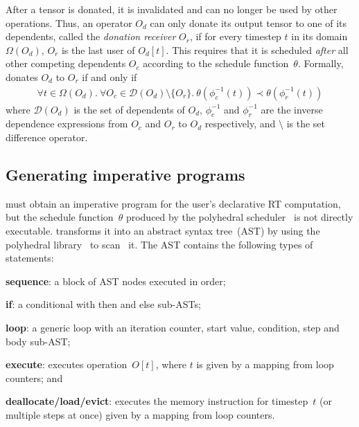 After a tensor is donated, it is invalidated and can no longer be used by other operations.
Thus, an operator $O_d$ can only donate its output tensor to one of its dependents, called the \emph{donation receiver} $O_r$, if for every timestep $t$ in its domain $\Omega(O_d)$, $O_r$ is the last user of $O_d[t]$. This requires that it is scheduled \emph{after} all other competing dependents $O_c$ according to the schedule function~$\theta$. Formally, \sys donates $O_d$ to $O_r$ if and only if
\begin{align*}
\forall t \in \Omega(O_d) .\ \forall O_c \in \mathcal{D}(O_d) \setminus \{O_r\} .\ \theta\left(\phi^{-1}_{c}(t)\right) \prec \theta\left(\phi^{-1}_{r}(t)\right)
\end{align*}
where $\mathcal{D}(O_d)$ is the set of dependents of $O_d$, $\phi^{-1}_{c}$ and $\phi^{-1}_{r}$ are the inverse dependence expressions from $O_c$ and $O_r$ to $O_d$ respectively, and $\setminus$ is the set difference operator. %

\subsection{Generating imperative programs}
\label{sec:ast_build}

\sys{} must obtain an imperative program for the user's declarative RT computation, but the schedule function~$\theta$ produced by the polyhedral scheduler~\cite{bondhugula2008pluto} is not directly executable. \sys{} transforms it into an abstract syntax tree~(AST) by using the polyhedral library~\cite{verdoolaege2010isl} to scan~\cite{grosser2015polyhedral} it. The AST contains the following types of statements:
%
\begin{myitemize}
  \item \textbf{sequence}: a block of AST nodes executed in order;%
  \item \textbf{if}: a conditional with then and else sub-ASTs;
  \item \textbf{loop}: a generic loop with an iteration counter, start value, condition, step and body sub-AST;
  \item \textbf{execute}: executes operation~$O[t]$, where $t$ is given by a mapping from loop counters; and
  \item \textbf{deallocate/load/evict}: executes the memory instruction for timestep~$t$ (or multiple steps at once) given by a mapping from loop counters.
\end{myitemize}

